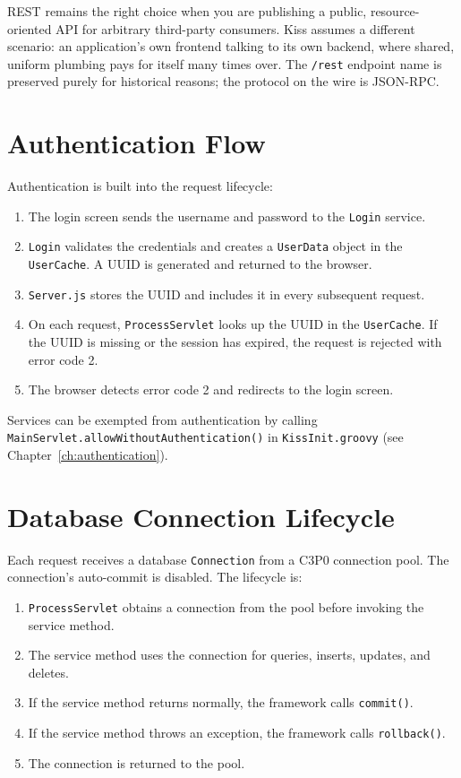 \noindent
REST remains the right choice when you are publishing a public, resource-oriented API for arbitrary third-party consumers.  Kiss assumes a different scenario: an application's own frontend talking to its own backend, where shared, uniform plumbing pays for itself many times over.  The \texttt{/rest} endpoint name is preserved purely for historical reasons; the protocol on the wire is JSON-RPC.

\section{Authentication Flow}
\label{sec:arch-auth}

Authentication is built into the request lifecycle:

\begin{enumerate}
  \item The login screen sends the username and password to the \texttt{Login} service.
  \item \texttt{Login} validates the credentials and creates a \texttt{UserData} object in the \texttt{UserCache}.  A UUID is generated and returned to the browser.
  \item \texttt{Server.js} stores the UUID and includes it in every subsequent request.
  \item On each request, \texttt{ProcessServlet} looks up the UUID in the \texttt{UserCache}.  If the UUID is missing or the session has expired, the request is rejected with error code 2.
  \item The browser detects error code 2 and redirects to the login screen.
\end{enumerate}

\noindent
Services can be exempted from authentication by calling
\texttt{MainServlet.allow\-Without\-Authentication()} in \texttt{KissInit.groovy} (see Chapter~\ref{ch:authentication}).

\section{Database Connection Lifecycle}
\label{sec:arch-dbconn}

Each request receives a database \texttt{Connection} from a C3P0 connection pool.  The connection's auto-commit is disabled.  The lifecycle is:

\begin{enumerate}
  \item \texttt{ProcessServlet} obtains a connection from the pool before invoking the service method.
  \item The service method uses the connection for queries, inserts, updates, and deletes.
  \item If the service method returns normally, the framework calls \texttt{commit()}.
  \item If the service method throws an exception, the framework calls \texttt{rollback()}.
  \item The connection is returned to the pool.
\end{enumerate}

